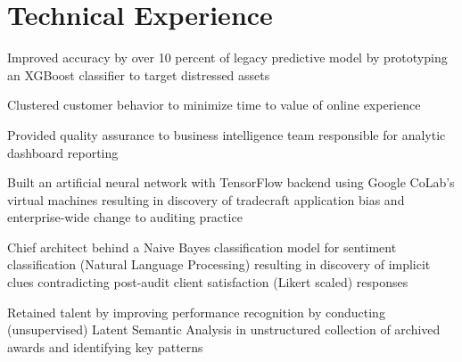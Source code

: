 \documentclass[]{Forester-Resume}
\begin{document}
\hfill
\begin{minipage}[t]{0.66\textwidth} 


\section{Technical Experience}
\vspace{\topsep} %
\begin{tightemize}

\item Improved accuracy by over 10 percent of legacy predictive model by prototyping an XGBoost classifier to target distressed assets 

\item Clustered customer behavior to minimize time to value of online experience  

\item Provided quality assurance to business intelligence team responsible for analytic dashboard reporting
\end{tightemize}

\sectionsep
{}

\begin{tightemize}

\item Built an artificial neural network with TensorFlow backend using Google CoLab's virtual machines resulting in discovery of tradecraft application bias and enterprise-wide change to auditing practice 

\item Chief architect behind a Naive Bayes classification model for sentiment classification (Natural Language Processing) resulting in discovery of implicit clues contradicting post-audit client satisfaction (Likert scaled) responses

\item Retained talent by improving performance recognition by conducting (unsupervised) Latent Semantic Analysis in unstructured collection of archived awards and identifying key patterns 


\end{tightemize}
\end{minipage}
\end{document}
